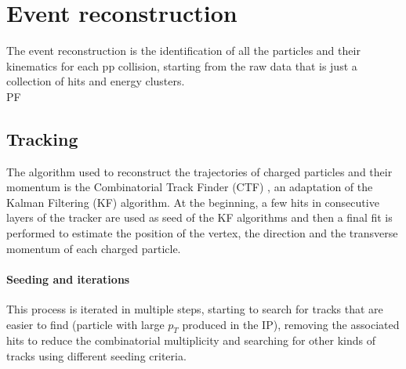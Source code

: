 
\label{sec:RECO}
\minitoc

\section{Event reconstruction}
The event reconstruction is the identification of all the particles and their kinematics for each pp collision, starting from the raw data that is just a collection of hits and energy clusters.\\

PF
\ADDREF 
\subsection{Tracking}
The algorithm used to reconstruct the trajectories of charged particles and their momentum is the Combinatorial Track Finder (CTF) \ADDREF, an adaptation of the Kalman Filtering (KF) \ADDREF algorithm.
At the beginning, a few hits in consecutive layers of the tracker are used as seed of the KF algorithms and then a final fit is performed to estimate the position of the vertex, the direction and the transverse momentum of each charged particle.\\

\paragraph*{Seeding and iterations}
This process is iterated in multiple steps, starting to search for tracks that are easier to find (\eg particle with large $p_T$ produced in the IP), removing the associated hits to reduce the combinatorial multiplicity and searching for other kinds of tracks using different seeding criteria.

